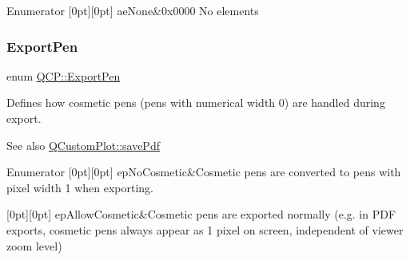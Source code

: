 \begin{DoxyEnumFields}{Enumerator}
[0pt][0pt]{}\mbox{\label{namespace_q_c_p_ae55dbe315d41fe80f29ba88100843a0caa9e90d81896358757d94275aeaa58f6a}} 
ae\+None&{\ttfamily 0x0000} No elements \\
\hline

\end{DoxyEnumFields}
\mbox{\label{namespace_q_c_p_a17844f19e1019693a953e1eb93536d2f}} 
\subsubsection{\texorpdfstring{Export\+Pen}{ExportPen}}
{\footnotesize\ttfamily enum \hyperlink{namespace_q_c_p_a17844f19e1019693a953e1eb93536d2f}{Q\+C\+P\+::\+Export\+Pen}}

Defines how cosmetic pens (pens with numerical width 0) are handled during export.

\begin{DoxySeeAlso}{See also}
\hyperlink{class_q_custom_plot_ad5acd34f6b39c3516887d7e54fec2412}{Q\+Custom\+Plot\+::save\+Pdf} 
\end{DoxySeeAlso}
\begin{DoxyEnumFields}{Enumerator}
[0pt][0pt]{}\mbox{\label{namespace_q_c_p_a17844f19e1019693a953e1eb93536d2faae8fcfaafee234ce18558afef83f6a78}} 
ep\+No\+Cosmetic&Cosmetic pens are converted to pens with pixel width 1 when exporting. \\
\hline

[0pt][0pt]{}\mbox{\label{namespace_q_c_p_a17844f19e1019693a953e1eb93536d2fa50d3657dba3fb90560b93a823cb0a6e8}} 
ep\+Allow\+Cosmetic&Cosmetic pens are exported normally (e.\+g. in P\+DF exports, cosmetic pens always appear as 1 pixel on screen, independent of viewer zoom level) \\
\hline

\end{DoxyEnumFields}
\mbox{\label{namespace_q_c_p_a2ad6bb6281c7c2d593d4277b44c2b037}} 
